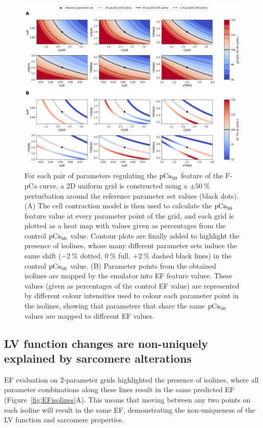 \begin{figure}[h!]
    \myfloatalign
    \includegraphics[width=\textwidth]{figures/chapter08/Fig5.pdf}
    \caption{For each pair of parameters regulating the $\textrm{pCa}_{50}$ feature of the F-pCa curve, a $2$D uniform grid is constructed using a $\pm\SI{50}{\percent}$ perturbation around the reference parameter set values (black dots). (A) The cell contraction model is then used to calculate the $\textrm{pCa}_{50}$ feature value at every parameter point of the grid, and each grid is plotted as a heat map with values given as percentages from the control $\textrm{pCa}_{50}$ value. Contour plots are finally added to highlight the presence of isolines, whose many different parameter sets induce the same shift ($-\SI{2}{\percent}$ dotted, $\SI{0}{\percent}$ full, $+\SI{2}{\percent}$ dashed black lines) in the control $\textrm{pCa}_{50}$ value. (B) Parameter points from the obtained isolines are mapped by the emulator into EF feature values. These values (given as percentages of the control EF value) are represented by different colour intensities used to colour each parameter point in the isolines, showing that parameters that share the same $\textrm{pCa}_{50}$ values are mapped to different EF values.}
    \label{fig:pca50isolines}
\end{figure}


%
%
%
\subsection{LV function changes are non-uniquely explained by sarcomere alterations}\label{sec:changesLVfunctionresult}
EF evaluation on $2$-parameter grids highlighted the presence of isolines, where all parameter combinations along these lines result in the same predicted EF (Figure~\ref{fig:EFisolines}A). This means that moving between any two points on each isoline will result in the same EF, demonstrating the non-uniqueness of the LV function and sarcomere properties.


